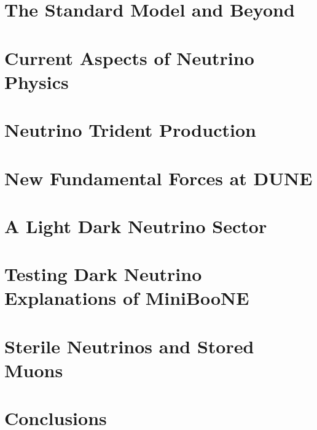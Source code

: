 \documentclass[openany,twoside,frontopenright,openright]{ip3thesis}
\begin{document}
\chapter{The Standard Model and Beyond}


\chapter{Current Aspects of Neutrino Physics}
% 


\chapter{Neutrino Trident Production}


\cleardoublepage
\chapter{New Fundamental Forces at DUNE}


\chapter{A Light Dark Neutrino Sector}


\chapter{Testing Dark Neutrino Explanations of MiniBooNE }


\cleardoublepage
\chapter{Sterile Neutrinos and Stored Muons}


\chapter{Conclusions}

\end{document}
